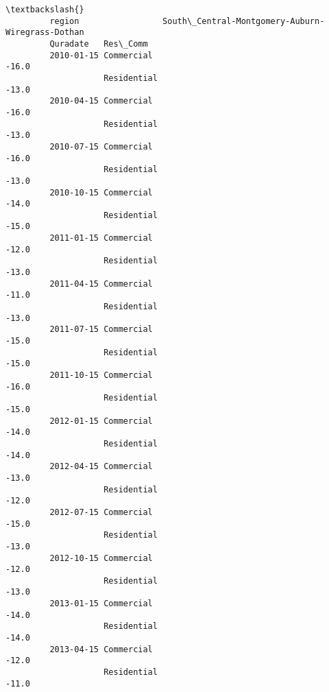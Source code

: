 \documentclass[11pt]{article}
\begin{document}
\begin{Verbatim}[commandchars=\\\{\}]
                                                                                  \textbackslash{}
         region                 South\_Central-Montgomery-Auburn-Wiregrass-Dothan   
         Quradate   Res\_Comm                                                       
         2010-01-15 Commercial                                             -16.0   
                    Residential                                            -13.0   
         2010-04-15 Commercial                                             -16.0   
                    Residential                                            -13.0   
         2010-07-15 Commercial                                             -16.0   
                    Residential                                            -13.0   
         2010-10-15 Commercial                                             -14.0   
                    Residential                                            -15.0   
         2011-01-15 Commercial                                             -12.0   
                    Residential                                            -13.0   
         2011-04-15 Commercial                                             -11.0   
                    Residential                                            -13.0   
         2011-07-15 Commercial                                             -15.0   
                    Residential                                            -15.0   
         2011-10-15 Commercial                                             -16.0   
                    Residential                                            -15.0   
         2012-01-15 Commercial                                             -14.0   
                    Residential                                            -14.0   
         2012-04-15 Commercial                                             -13.0   
                    Residential                                            -12.0   
         2012-07-15 Commercial                                             -15.0   
                    Residential                                            -13.0   
         2012-10-15 Commercial                                             -12.0   
                    Residential                                            -13.0   
         2013-01-15 Commercial                                             -14.0   
                    Residential                                            -14.0   
         2013-04-15 Commercial                                             -12.0   
                    Residential                                            -11.0   

\end{Verbatim}
\end{document}

